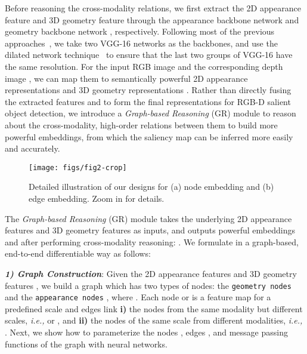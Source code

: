 \documentclass[runningheads]{llncs}
\begin{document}
		Before reasoning the cross-modality relations, we first extract the 2D appearance feature  and 3D geometry feature  through the appearance backbone network  and geometry backbone network , respectively. Following most of the previous approaches~\cite{Piao_2019_ICCV,Chen_2018_CVPR,chen2019multi,han2017cnns,zhu2019pdnet}, we take two VGG-16 networks as the backbones, and use the dilated network technique~\cite{yu2015multi} to ensure that the last two groups of VGG-16 have the same resolution. For the input RGB image  and the corresponding depth image , we can map them to semantically powerful 2D appearance representations  and 3D geometry representations . Rather than directly fusing the extracted features  and  to form the final representations for RGB-D salient object detection, we introduce a {\em Graph-based Reasoning} (GR) module to reason about the cross-modality, high-order relations between them to build more powerful embeddings, from which the saliency map can be inferred more easily and accurately. 
		
		    \begin{figure*}[pt]
			\begin{center}
				\texttt{[image: figs/fig2-crop]}
			\end{center}
			\caption{Detailed illustration of our designs for (a) node embedding and (b) edge embedding. Zoom in for details.}
			\label{fig:k}
		\end{figure*}

		The {\em Graph-based Reasoning} (GR) module  takes the underlying 2D appearance features  and 3D geometry features  as inputs, and outputs powerful embeddings  and  after performing cross-modality reasoning: . We formulate  in a graph-based, end-to-end differentiable way as follows:
		
\noindent \emph{\textbf{\footnotesize 1) Graph Construction}}: Given the 2D appearance features  and 3D geometry features , we build a graph  which has two types of nodes: the {\tt geometry nodes}  and the {\tt appearance nodes} , where . Each node  or  is a feature map for a predefined scale  and edges link {\bfseries \small i)} the nodes from the same modality but different scales, \emph{i.e.,}  or , and {\bfseries \small ii)} the nodes of the same scale from different modalities, \emph{i.e.,} . Next, we show how to parameterize the nodes , edges , and message passing functions  of the graph  with neural networks.
\end{document}
